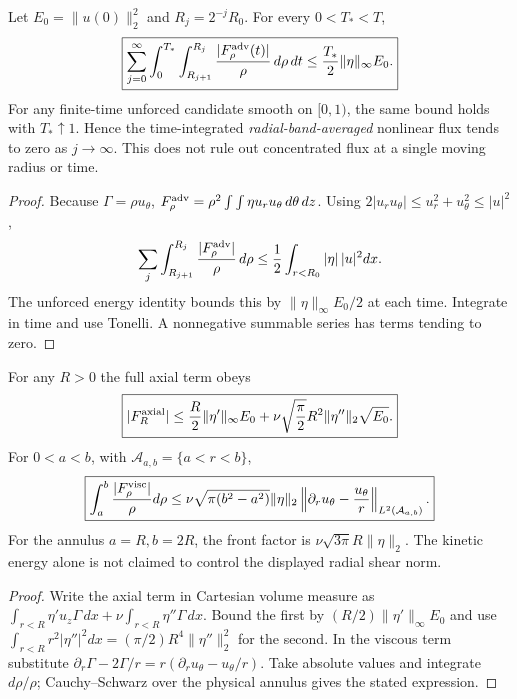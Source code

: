 \begin{theorem}
\label{thm:xxxix-dyadic}
Let $E_0=\|u(0)\|_2^2$ and $R_j=2^{-j}R_0$.
For every $0<T_*<T$,
\begin{equation}\label{eq:xxxix-energy-sum}
\boxed{
\sum_{j=0}^\infty\int_0^{T_*}
\int_{R_{j+1}}^{R_j}
\frac{|F_\rho^{\rm adv}(t)|}{\rho}\,d\rho\,dt
\le\frac{T_*}{2}\|\eta\|_\infty E_0.
}
\end{equation}
For any finite-time unforced candidate smooth on $[0,1)$,
the same bound holds with $T_*\uparrow1$.
Hence the time-integrated \emph{radial-band-averaged}
nonlinear flux tends to zero as $j\to\infty$.
This does not rule out concentrated flux at a single
moving radius or time.
\end{theorem}
\begin{proof}
Because $\Gamma=\rho u_\theta$,
$F_\rho^{\rm adv}=
\rho^2\int\int \eta u_r u_\theta\,d\theta\,dz$.
Using $2|u_ru_\theta|\le u_r^2+u_\theta^2\le|u|^2$,
\[
\sum_j\int_{R_{j+1}}^{R_j}
\frac{|F_\rho^{\rm adv}|}{\rho}\,d\rho
\le\frac12\int_{r<R_0}|\eta|\,|u|^2dx.
\]
The unforced energy identity bounds this by
$\|\eta\|_\infty E_0/2$ at each time. Integrate in
time and use Tonelli. A nonnegative summable series
has terms tending to zero.
\end{proof}

\begin{proposition}
\label{prop:xxxix-losses}
For any $R>0$ the full axial term obeys
\begin{equation}\label{eq:xxxix-axial-bound}
\boxed{
|F_R^{\rm axial}|
\le\frac{R}{2}\|\eta'\|_\infty E_0+
\nu\sqrt{\frac{\pi}{2}}R^2\|\eta''\|_2\sqrt{E_0}.
}
\end{equation}
For $0<a<b$, with $\mathcal A_{a,b}=\{a<r<b\}$,
\begin{equation}\label{eq:xxxix-visc-bound}
\boxed{
\int_a^b\frac{|F_\rho^{\rm visc}|}{\rho}d\rho
\le\nu\sqrt{\pi(b^2-a^2)}\|\eta\|_2
\left\|\partial_ru_\theta-\frac{u_\theta}{r}
\right\|_{L^2(\mathcal A_{a,b})}.
}
\end{equation}
For the annulus $a=R,b=2R$, the front factor is
$\nu\sqrt{3\pi}R\|\eta\|_2$.
The kinetic energy alone is not claimed to control
the displayed radial shear norm.
\end{proposition}
\begin{proof}
Write the axial term in Cartesian volume measure as
$\int_{r<R}\eta' u_z\Gamma\,dx+
\nu\int_{r<R}\eta''\Gamma\,dx$.
Bound the first by
$(R/2)\|\eta'\|_\infty E_0$ and use
$\int_{r<R}r^2|\eta''|^2dx
=(\pi/2)R^4\|\eta''\|_2^2$ for the second.
In the viscous term substitute
$\partial_r\Gamma-2\Gamma/r
=r(\partial_ru_\theta-u_\theta/r)$.
Take absolute values and integrate $d\rho/\rho$;
Cauchy--Schwarz over the physical annulus gives
the stated expression.
\end{proof}

